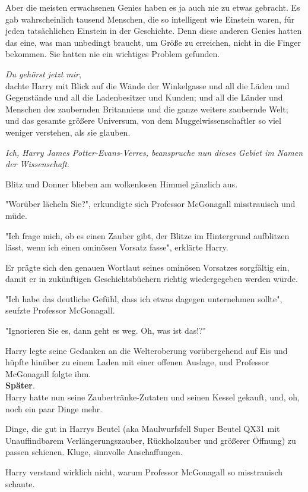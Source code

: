 {Aber die meisten erwachsenen Genies haben es ja auch nie zu etwas gebracht. Es gab wahrscheinlich tausend Menschen, die so intelligent wie Einstein waren, für jeden tatsächlichen Einstein in der Geschichte. Denn diese anderen Genies hatten das eine, was man unbedingt braucht, um Größe zu erreichen, nicht in die Finger bekommen. Sie hatten nie ein wichtiges Problem gefunden.

\emph{Du gehörst jetzt mir},\\ dachte Harry mit Blick auf die Wände der Winkelgasse und all die Läden und Gegenstände und all die Ladenbesitzer und Kunden; und all die Länder und Menschen des zaubernden Britanniens und die ganze weitere zaubernde Welt; und das gesamte größere Universum, von dem Muggelwissenschaftler so viel weniger verstehen, als sie glauben.

\emph{Ich, Harry James Potter-Evans-Verres, beanspruche nun dieses Gebiet im Namen der Wissenschaft}.

Blitz und Donner blieben am wolkenlosen Himmel gänzlich aus.

"Worüber lächeln Sie?", erkundigte sich Professor McGonagall misstrauisch und müde.

"Ich frage mich, ob es einen Zauber gibt, der Blitze im Hintergrund aufblitzen lässt, wenn ich einen ominösen Vorsatz fasse", erklärte Harry.

Er prägte sich den genauen Wortlaut seines ominösen Vorsatzes sorgfältig ein, damit er in zukünftigen Geschichtsbüchern richtig wiedergegeben werden würde.

"Ich habe das deutliche Gefühl, dass ich etwas dagegen unternehmen sollte", seufzte Professor McGonagall.

"Ignorieren Sie es, dann geht es weg. Oh, was ist das!?"

Harry legte seine Gedanken an die Welteroberung vorübergehend auf Eis und hüpfte hinüber zu einem Laden mit einer offenen Auslage, und Professor McGonagall folgte ihm.\\ \textbf{Später}.\\ Harry hatte nun seine Zaubertränke-Zutaten und seinen Kessel gekauft, und, oh, noch ein paar Dinge mehr.

Dinge, die gut in Harrys Beutel (aka Maulwurfsfell Super Beutel QX31 mit Unauffindbarem Verlängerungszauber, Rückholzauber und größerer Öffnung) zu passen schienen. Kluge, sinnvolle Anschaffungen.

Harry verstand wirklich nicht, warum Professor McGonagall so misstrauisch schaute.

}
